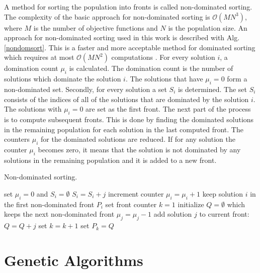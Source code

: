 A method for sorting the population into fronts is called non-dominated sorting. 
The complexity of the basic approach for non-dominated sorting is $\mathcal{O}(MN^3)$, where $M$ is the number of objective functions and $N$ is the population size.
An approach for non-dominated sorting used in this work is described with Alg. 
\ref{nondomsort}. This is a faster and more acceptable method for dominated sorting which requires at most $\mathcal{O}(MN^2)$ computations \cite{deb2001multi}.
For every solution $i$, a domination count $\mu_i$ is calculated. 
The domination count is the number of solutions which dominate the solution $i$. 
The solutions that have $\mu_i = 0$ form a non-dominated set.
Secondly, for every solution a set $S_i$ is determined. The set $S_i$ consists of the indices of all of the solutions that are dominated by the solution $i$. 
The solutions with $\mu_i=0$ are set as the first front. 
The next part of the process is to compute subsequent fronts.
This is done by finding the dominated solutions in the remaining population for each solution in the last computed front.
The counters $\mu_i$ for the dominated solutions are reduced. 
If for any solution the counter $\mu_i$ becomes zero, it means that the solution is not dominated by any solutions in the remaining population and it is added to a new front. 

\newpage
\begin{algorithm}
\caption{Non-dominated sorting.\label{nondomsort}}
\begin{algorithmic}[1]
\State set $\mu_i = 0$ and $S_i = \emptyset$
\EndFor
{}
\State $S_i = S_i + j$
\State increment counter $\mu_i = \mu_i + 1$
\EndIf
{} 
\State keep solution $i$ in the first non-dominated front $P_i$
\State set front counter $k=1$
\EndIf
\EndFor
{}
\State initialize $Q = \emptyset$ which keeps the next non-dominated front
\State $\mu_j = \mu_j - 1$
\State add solution $j$ to current front: $Q = Q + j$
\EndIf
\EndFor
\State set $k = k+1$
\State set $P_k = Q$
\EndWhile
\end{algorithmic}
\end{algorithm}

\section{Genetic Algorithms}

